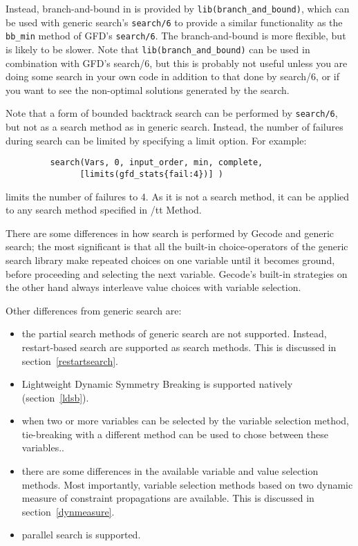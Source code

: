 Instead, branch-and-bound in {\eclipse} is provided by {\tt lib(branch_and_bound)}, which can
be used with generic search's {\tt search/6} to provide a similar functionality as
the {\tt bb_min} method of GFD's {\tt search/6}. The {\eclipse} branch-and-bound is more 
flexible, but is likely to be slower. Note that {\tt lib(branch_and_bound)} can
be used in combination with GFD's search/6, but this is probably not useful
unless you are doing some search in your own code in addition to that done by 
search/6, or if you want to see the non-optimal solutions generated by the
search.

Note that a form of bounded backtrack search can be performed by 
{\tt search/6}, but not as a search method as in
generic search. Instead, the number of failures during search can be 
limited by specifying a limit option. For example:

\begin{verbatim}
         search(Vars, 0, input_order, min, complete,
               [limits(gfd_stats{fail:4})] )
\end{verbatim}

limits the number of failures to 4. As it is not a search method, it can be
applied to any search method specified in {/tt Method}.

There are some differences in how search is performed by Gecode and generic
search;
the most significant is that all the built-in choice-operators of the generic
search library make repeated choices on one variable until it becomes ground,
before proceeding and selecting the next variable.  Gecode's built-in
strategies on the other hand always interleave value choices with variable
selection.

Other differences from generic search are: 
\begin{itemize} 

\item the partial search methods of generic search are not supported.
Instead, restart-based search are supported as search methods. This is 
discussed in section~\ref{restartsearch}.
\item Lightweight Dynamic Symmetry Breaking is supported natively 
(section~\ref{ldsb}).
\item when two or more variables can be selected by the variable selection
method, tie-breaking with a different method can be  used to chose between
these variables..
\item there are some differences in the available variable and value 
selection methods. Most importantly, variable selection methods based
on two dynamic measure of constraint propagations are available. This
is discussed in section~\ref{dynmeasure}.
\item parallel search is supported.
\end{itemize}

